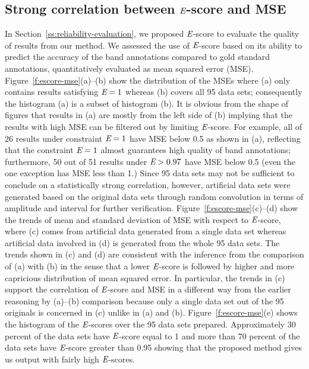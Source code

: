 \subsection{Strong correlation between ${\emph{E}}$-score and MSE}

In Section~\ref{ss:reliability-evaluation}, we proposed ${\emph{E}}$-score to evaluate the quality of results from our method. We assessed the use of ${\emph{E}}$-score based on its ability to predict the accuracy of the band annotations compared to gold standard annotations, quantitatively evaluated as mean squared error (MSE). Figure~\ref{f:escore-mse}(a)--(b) show the distribution of the MSEs where (a) only contains results satisfying ${\emph{E}} = 1$ whereas (b) covers all 95 data sets; consequently the histogram (a) is a subset of histogram (b). It is obvious from the shape of figures that results in (a) are mostly from the left side of (b) implying that the results with high MSE can be filtered out by limiting ${\emph{E}}$-score. For example, all of 26 results under constraint ${\emph{E}}=1$ have MSE below 0.5 as shown in (a), reflecting that the constraint ${\emph{E}}=1$ almost guarantees high quality of band annotations; furthermore, 50 out of 51 results under ${\emph{E}}>0.97$ have MSE below 0.5 (even the one exception has MSE less than 1.) Since 95 data sets may not be sufficient to conclude on a statistically strong correlation, however, artificial data sets were generated based on the original data sets through random convolution in terms of amplitude and interval for further verification. Figure~\ref{f:escore-mse}(c)--(d) show the trends of mean and standard deviation of MSE with respect to ${\emph{E}}$-score, where (c) comes from artificial data generated from a single data set whereas artificial data involved in (d) is generated from the whole 95 data sets. The trends shown in (c) and (d) are consistent with the inference from the comparison of (a) with (b) in the sense that a lower ${\emph{E}}$-score is followed by higher and more capricious distribution of mean squared error. In particular, the trends in (c) support the correlation of ${\emph{E}}$-score and MSE in a different way from the earlier reasoning by (a)--(b) comparison because only a single data set out of the 95 originals is concerned in (c) unlike in (a) and (b). Figure~\ref{f:escore-mse}(e) shows the histogram of the ${\emph{E}}$-scores over the 95 data sets prepared. Approximately 30 percent of the data sets have ${\emph{E}}$-score equal to 1 and more than 70 percent of the data sets have ${\emph{E}}$-score greater than 0.95 showing that the proposed method gives us output with fairly high ${\emph{E}}$-scores.



